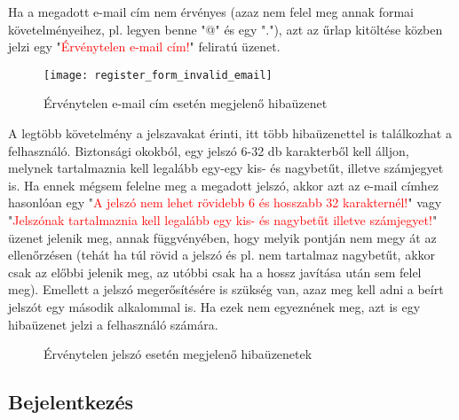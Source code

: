 Ha a megadott e-mail cím nem érvényes (azaz nem felel meg annak formai követelményeihez, pl. legyen benne "@" és egy "."), azt az űrlap kitöltése közben jelzi egy "\textcolor{red}{Érvénytelen e-mail cím!}" feliratú üzenet.

\begin{figure}[H]
	\centering
	\texttt{[image: register\_form\_invalid\_email]}
	\caption{Érvénytelen e-mail cím esetén megjelenő hibaüzenet}
	\label{fig:register_form_invalid_email}
\end{figure}

A legtöbb követelmény a jelszavakat érinti, itt több hibaüzenettel is találkozhat a felhasználó. Biztonsági okokból, egy jelszó 6-32 db karakterből kell álljon, melynek tartalmaznia kell legalább egy-egy kis- és nagybetűt, illetve számjegyet is. Ha ennek mégsem felelne meg a megadott jelszó, akkor azt az e-mail címhez hasonlóan egy "\textcolor{red}{A jelszó nem lehet rövidebb 6 és hosszabb 32 karakternél!}" vagy "\textcolor{red}{Jelszónak tartalmaznia kell legalább egy kis- és nagybetűt illetve számjegyet!}" üzenet jelenik meg, annak függvényében, hogy melyik pontján nem megy át az ellenőrzésen (tehát ha túl rövid a jelszó és pl. nem tartalmaz nagybetűt, akkor csak az előbbi jelenik meg, az utóbbi csak ha a hossz javítása után sem felel meg). Emellett a jelszó megerősítésére is szükség van, azaz meg kell adni a beírt jelszót egy második alkalommal is. Ha ezek nem egyeznének meg, azt is egy hibaüzenet jelzi a felhasználó számára.

\begin{figure}[H]
	\centering
	\hspace{5pt}
	\hspace{5pt}
	\caption{Érvénytelen jelszó esetén megjelenő hibaüzenetek}
	\label{fig:register_form_invalid_password}
\end{figure}

\subsection{Bejelentkezés}

